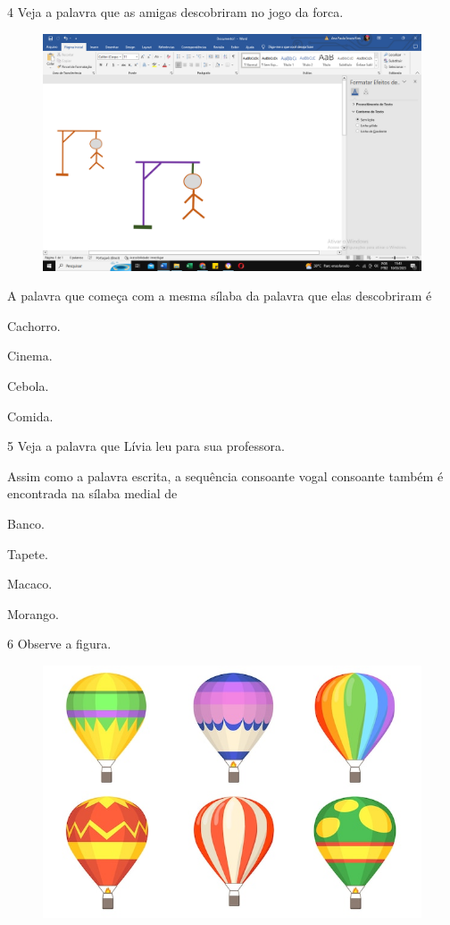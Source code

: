 \num{4} Veja a palavra que as amigas descobriram no jogo da forca.

\begin{figure}[htpb!]
\centering
\includegraphics[width=.5\textwidth]{media/image166.png}
\end{figure}

A palavra que começa com a mesma sílaba da palavra que elas descobriram é

\begin{escolha}
\item Cachorro.

\item Cinema.

\item Cebola.

\item Comida.
\end{escolha}

\num{5} Veja a palavra que Lívia leu para sua professora.

Assim como a palavra escrita, a sequência consoante vogal consoante também é encontrada na sílaba medial de

\begin{escolha}
\item Banco.

\item Tapete.

\item Macaco.

\item Morango.
\end{escolha}

\num{6} Observe a figura.

\begin{figure}[htpb!]
\centering
\includegraphics[width=.5\textwidth]{media/image167.jpeg}
\end{figure}

